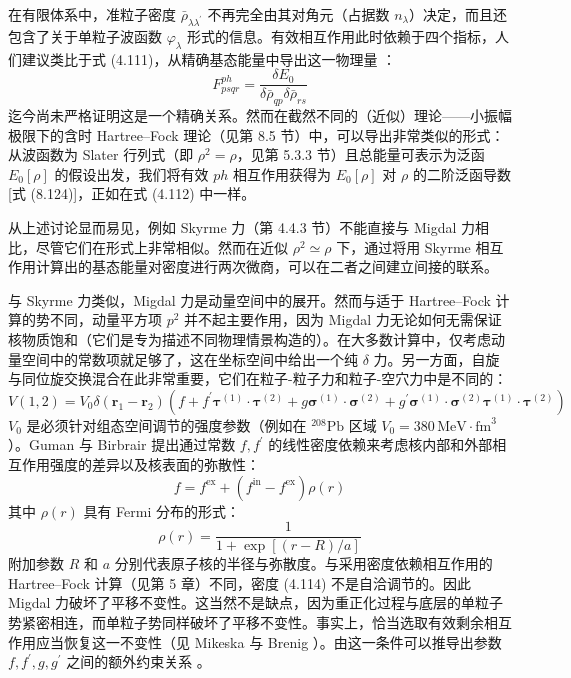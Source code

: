 在有限体系中，准粒子密度 $\bar{\rho}_{\lambda\lambda^{\prime}}$ 不再完全由其对角元（占据数
$n_{\lambda}$）决定，而且还包含了关于单粒子波函数 $\varphi_{\lambda}$ 形式的信息。有效相互作用此时依赖于四个指标，人们建议类比于式
(4.111)，从精确基态能量中导出这一物理量 \cite{Br71}：
\begin{equation}
F^{ph}_{psqr}=\frac{\delta E_{0}}{\delta\bar{\rho}_{qp}\delta\bar{\rho}_{rs}}\label{eq:4.112}
\end{equation}
迄今尚未严格证明这是一个精确关系。然而在截然不同的（近似）理论——小振幅极限下的含时 Hartree–Fock 理论（见第 8.5
节）中，可以导出非常类似的形式：从波函数为 Slater 行列式（即 $\rho^{2}=\rho$，见第 5.3.3 节）且总能量可表示为泛函
$E_{0}[\rho]$ 的假设出发，我们将有效 $ph$ 相互作用获得为 $E_{0}[\rho]$ 对 $\rho$
的二阶泛函导数 {[}式 (8.124){]}，正如在式 (4.112) 中一样。

从上述讨论显而易见，例如 Skyrme 力（第 4.4.3 节）不能直接与 Migdal 力相比，尽管它们在形式上非常相似。然而在近似
$\rho^{2}\simeq\rho$ 下，通过将用 Skyrme 相互作用计算出的基态能量对密度进行两次微商，可以在二者之间建立间接的联系。

与 Skyrme 力类似，Migdal 力是动量空间中的展开。然而与适于 Hartree–Fock 计算的势不同，动量平方项 $p^{2}$
并不起主要作用，因为 Migdal 力无论如何无需保证核物质饱和（它们是专为描述不同物理情景构造的）。在大多数计算中，仅考虑动量空间中的常数项就足够了，这在坐标空间中给出一个纯
$\delta$ 力。另一方面，自旋与同位旋交换混合在此非常重要，它们在粒子-粒子力和粒子-空穴力中是不同的：
\begin{equation}
V(1,2)=V_{0}\delta(\boldsymbol{r}_{1}-\boldsymbol{r}_{2})(f+f^{\prime}\boldsymbol{\tau}^{(1)}\cdot\boldsymbol{\tau}^{(2)}+g\boldsymbol{\sigma}^{(1)}\cdot\boldsymbol{\sigma}^{(2)}+g^{\prime}\boldsymbol{\sigma}^{(1)}\cdot\boldsymbol{\sigma}^{(2)}\boldsymbol{\tau}^{(1)}\cdot\boldsymbol{\tau}^{(2)})\label{eq:4.113}
\end{equation}
$V_{0}$ 是必须针对组态空间调节的强度参数（例如在 $^{208}\mathrm{Pb}$ 区域 $V_{0}=380\,\text{MeV}\cdot\text{fm}^{3}$）。Guman
与 Birbrair \cite{GB65} 提出通过常数 $f,f^{\prime}$ 的线性密度依赖来考虑核内部和外部相互作用强度的差异以及核表面的弥散性：
\begin{equation}
f=f^{\text{ex}}+(f^{\text{in}}-f^{\text{ex}})\rho(r)\label{eq:4.114}
\end{equation}
其中 $\rho(r)$ 具有 Fermi 分布的形式：
\begin{equation}
\rho(r)=\frac{1}{1+\exp[(r-R)/a]}\label{eq:4.115}
\end{equation}
附加参数 $R$ 和 $a$ 分别代表原子核的半径与弥散度。与采用密度依赖相互作用的 Hartree–Fock 计算（见第 5
章）不同，密度 (4.114) 不是自洽调节的。因此 Migdal 力破坏了平移不变性。这当然不是缺点，因为重正化过程与底层的单粒子势紧密相连，而单粒子势同样破坏了平移不变性。事实上，恰当选取有效剩余相互作用应当恢复这一不变性（见
Mikeska 与 Brenig \cite{MB69}）。由这一条件可以推导出参数 $f,f^{\prime},g,g^{\prime}$
之间的额外约束关系 \cite{NW72,NW74}。

